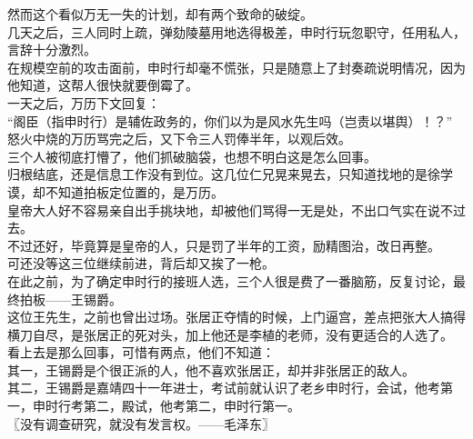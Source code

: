 \begin{multicols}{\theparacolNo}
然而这个看似万无一失的计划，却有两个致命的破绽。\\

几天之后，三人同时上疏，弹劾陵墓用地选得极差，申时行玩忽职守，任用私人，言辞十分激烈。\\

在规模空前的攻击面前，申时行却毫不慌张，只是随意上了封奏疏说明情况，因为他知道，这帮人很快就要倒霉了。\\

一天之后，万历下文回复：\\

“阁臣（指申时行）是辅佐政务的，你们以为是风水先生吗（岂责以堪舆）！？”\\

怒火中烧的万历骂完之后，又下令三人罚俸半年，以观后效。\\

三个人被彻底打懵了，他们抓破脑袋，也想不明白这是怎么回事。\\

归根结底，还是信息工作没有到位。这几位仁兄晃来晃去，只知道找地的是徐学谟，却不知道拍板定位置的，是万历。\\

皇帝大人好不容易亲自出手挑块地，却被他们骂得一无是处，不出口气实在说不过去。\\

不过还好，毕竟算是皇帝的人，只是罚了半年的工资，励精图治，改日再整。\\

可还没等这三位继续前进，背后却又挨了一枪。\\

在此之前，为了确定申时行的接班人选，三个人很是费了一番脑筋，反复讨论，最终拍板——王锡爵。\\

这位王先生，之前也曾出过场。张居正夺情的时候，上门逼宫，差点把张大人搞得横刀自尽，是张居正的死对头，加上他还是李植的老师，没有更适合的人选了。\\

看上去是那么回事，可惜有两点，他们不知道：\\

其一，王锡爵是个很正派的人，他不喜欢张居正，却并非张居正的敌人。\\

其二，王锡爵是嘉靖四十一年进士，考试前就认识了老乡申时行，会试，他考第一，申时行考第二，殿试，他考第二，申时行第一。\\

〖没有调查研究，就没有发言权。——毛泽东〗\\


\end{multicols}
